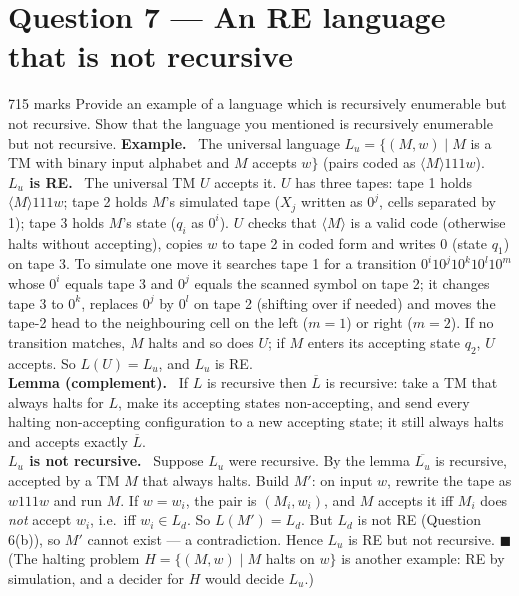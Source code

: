\documentclass[10.5pt,a4paper]{article}
\newcommand{\ansh}[1]{\textbf{\color{exborder}#1}\ }
\newcommand{\Ld}{L_d}
\newcommand{\Lu}{L_u}
\begin{document}
\section{Question 7 --- An RE language that is not recursive}
\begin{qa}{7}{15 marks}
Provide an example of a language which is recursively enumerable but not recursive. Show that the language you mentioned is recursively
enumerable but not recursive.
\tcblower
\ansh{Example.} The universal language $\Lu=\{(M,w)\mid M$ is a TM with binary input alphabet and $M$ accepts $w\}$ (pairs coded as
$\langle M\rangle111w$).\\
\ansh{$\Lu$ is RE.} The universal TM $U$ accepts it. $U$ has three tapes: tape 1 holds $\langle M\rangle111w$; tape 2 holds $M$'s simulated tape
($X_j$ written as $0^j$, cells separated by 1); tape 3 holds $M$'s state ($q_i$ as $0^i$). $U$ checks that $\langle M\rangle$ is a valid code
(otherwise halts without accepting), copies $w$ to tape 2 in coded form and writes $0$ (state $q_1$) on tape 3. To simulate one move it searches
tape 1 for a transition $0^i10^j10^k10^l10^m$ whose $0^i$ equals tape 3 and $0^j$ equals the scanned symbol on tape 2; it changes tape 3 to $0^k$,
replaces $0^j$ by $0^l$ on tape 2 (shifting over if needed) and moves the tape-2 head to the neighbouring cell on the left ($m=1$) or right ($m=2$).
If no transition matches, $M$ halts and so does $U$; if $M$ enters its accepting state $q_2$, $U$ accepts. So $L(U)=\Lu$, and $\Lu$ is RE.\\
\ansh{Lemma (complement).} If $L$ is recursive then $\overline L$ is recursive: take a TM that always halts for $L$, make its accepting states
non-accepting, and send every halting non-accepting configuration to a new accepting state; it still always halts and accepts exactly $\overline L$.\\
\ansh{$\Lu$ is not recursive.} Suppose $\Lu$ were recursive. By the lemma $\overline{\Lu}$ is recursive, accepted by a TM $M$ that always halts.
Build $M'$: on input $w$, rewrite the tape as $w111w$ and run $M$. If $w=w_i$, the pair is $(M_i,w_i)$, and $M$ accepts it iff $M_i$ does
\emph{not} accept $w_i$, i.e.\ iff $w_i\in\Ld$. So $L(M')=\Ld$. But $\Ld$ is not RE (Question 6(b)), so $M'$ cannot exist --- a contradiction.
Hence $\Lu$ is RE but not recursive. $\blacksquare$\\
(The halting problem $H=\{(M,w)\mid M$ halts on $w\}$ is another example: RE by simulation, and a decider for $H$ would decide $\Lu$.)
\end{qa}
\end{document}

